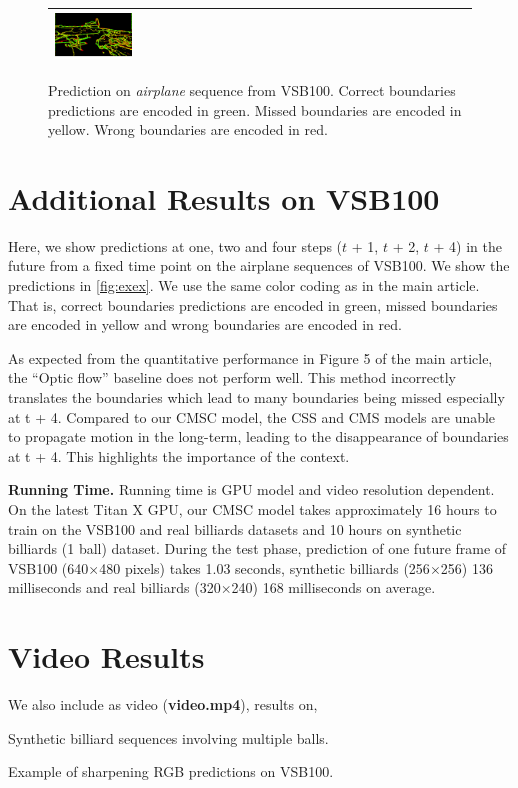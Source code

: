\documentclass[letterpaper]{article} %
\newcommand{\myparagraph}[1]{
\vspace{0.1cm}\noindent
\textbf{#1}
\hspace{0.1cm}
}
\begin{document}
\begin{figure}[t]
\begin{tabular}{ C{3.4cm}C{3.4cm}C{3.4cm}C{3.4cm} }
    \includegraphics[width=0.21\textwidth]{"images/fig4/1_t_4"}\\
    \bottomrule
    \end{tabular}
  \caption{Prediction on \emph{airplane} sequence from VSB100. Correct boundaries predictions are encoded in green. Missed boundaries are encoded in yellow. Wrong boundaries are encoded in red.}
  \label{fig:exex}
\end{figure}

\section{Additional Results on VSB100}
Here, we show predictions at one, two and four steps ($t$ + 1, $t$ + 2, $t$ + 4) in the future from a fixed time point on the airplane sequences of VSB100. We show the predictions in \autoref{fig:exex}. We use the same color coding as in the main article. That is, correct boundaries predictions are encoded in green, missed boundaries are encoded in yellow and wrong boundaries are encoded in red.

As expected from the quantitative performance in Figure 5 of the main article, the ``Optic flow'' baseline does not perform well. This method incorrectly translates the boundaries which lead to many boundaries being missed especially at t + 4. Compared to our CMSC model, the CSS and CMS models are unable to propagate motion in the long-term, leading to the disappearance of boundaries at t + 4. This highlights the importance of the context. 

\myparagraph{Running Time.} Running time is GPU model and video resolution dependent. On the latest Titan X GPU, our CMSC model takes approximately 16 hours to train on the VSB100 and real billiards datasets and 10 hours on synthetic billiards (1 ball) dataset. During the test phase, prediction of one future frame of VSB100 (640$\times$480 pixels) takes 1.03 seconds, synthetic billiards (256$\times$256) 136 milliseconds and real billiards (320$\times$240) 168 milliseconds on average.

\section{Video Results}

We also include as video (\textbf{video.mp4}), results on,  
\begin{enumerate*}
    \item Synthetic billiard sequences involving multiple balls.
    \item Example of sharpening RGB predictions on VSB100.
\end{enumerate*}



\end{document}
